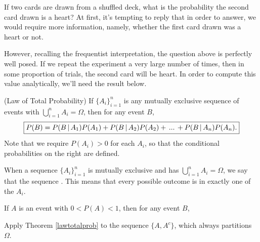 If two cards are drawn from a shuffled deck, what is the probability the second card drawn is a heart? At first, it's tempting to reply that in order to answer, we would require more information, namely, whether the first card drawn was a heart or not.
\par
However, recalling the frequentist interpretation, the question above is perfectly well posed. If we repeat the experiment a very large number of times, then in some proportion of trials, the second card will be heart. In order to compute this value analytically, we'll need the result below.
\par
\begin{thm}\label{lawtotalprob}
(Law of Total Probability) If $\{A_i\}_{i=1}^{n}$ is any mutually exclusive sequence of events with $\bigcup_{i=1}^{n}A_i = \Omega$, then for any event $B$,
$$\boxed{P(B) = P(B \,|\, A_1)P(A_1) + P(B \,|\, A_2)P(A_2)+ \, ... \, + P(B \,|\, A_n)P(A_n).}$$
\noindent Note that we require $P(A_i) > 0$ for each $A_i$, so that the conditional probabilities on the right are defined.
\end{thm}
\par
When a sequence $\{A_i\}_{i=1}^{n}$ is mutually exclusive and has $\bigcup_{i=1}^{n}A_i = \Omega$, we say that the sequence . This means that every possible outcome is in exactly one of the $A_i$.

\begin{center}
\end{center}

\begin{cor} If $A$ is an event with $0 < P(A) < 1$, then for any event $B$, 
\end{cor}
\begin{pf} Apply Theorem \ref{lawtotalprob} to the sequence $\{A, A^c\}$, which always partitions $\Omega$.
\end{pf}

